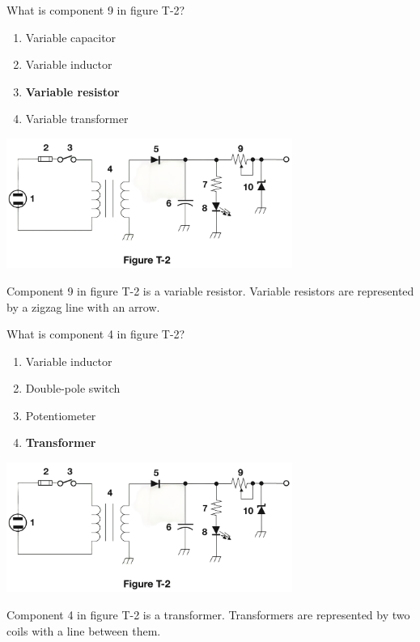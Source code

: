 \begin{tcolorbox}[
    colback=gray!10!white,
    colframe=black!75!black,
    title={T6C08},
    sidebyside,
    sidebyside align=top,
    lefthand width=0.45\textwidth
]
What is component 9 in figure T-2?
\begin{enumerate}[label=\Alph*),noitemsep]
    \item Variable capacitor
    \item Variable inductor
    \item \textbf{Variable resistor}
    \item Variable transformer
\end{enumerate}
\tcblower
\includegraphics[width=0.7\textwidth]{images/t2.png}
\end{tcolorbox}
Component 9 in figure T-2 is a variable resistor. Variable resistors are represented by a zigzag line with an arrow.

\begin{tcolorbox}[
    colback=gray!10!white,
    colframe=black!75!black,
    title={T6C09},
    sidebyside,
    sidebyside align=top,
    lefthand width=0.45\textwidth
]
What is component 4 in figure T-2?
\begin{enumerate}[label=\Alph*),noitemsep]
    \item Variable inductor
    \item Double-pole switch
    \item Potentiometer
    \item \textbf{Transformer}
\end{enumerate}
\tcblower
\includegraphics[width=0.7\textwidth]{images/t2.png}
\end{tcolorbox}
Component 4 in figure T-2 is a transformer. Transformers are represented by two coils with a line between them.

